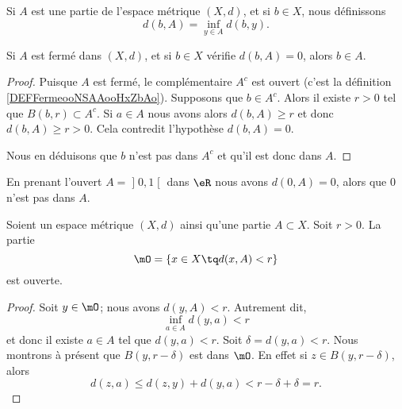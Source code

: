 \begin{definition}      \label{DEFooGNNUooFUZINs}
	Si \( A\) est une partie de l'espace métrique \( (X,d)\), et si \( b\in X\), nous définissons
	\begin{equation}
		d(b,A)=\inf_{y\in A}d(b,y).
	\end{equation}
\end{definition}

\begin{lemma}        \label{LEMooAIARooQADaxM}
	Si \( A\) est fermé dans \( (X,d)\), et si \( b\in X\) vérifie \( d(b,A)=0\), alors \( b\in A\).
\end{lemma}

\begin{proof}
	Puisque \( A\) est fermé, le complémentaire \( A^c\) est ouvert (c'est la définition \ref{DEFFermeooNSAAooHxZbAo}). Supposons que \( b\in A^c\). Alors il existe \( r>0\) tel que \( B(b,r)\subset A^c\). Si \( a\in A\) nous avons alors \( d(b,A)\geq r\) et donc \( d(b,A)\geq r>0\). Cela contredit l'hypothèse \( d(b,A)=0\).

	Nous en déduisons que \( b\) n'est pas dans \( A^c\) et qu'il est donc dans \( A\).
\end{proof}


\begin{example}
	En prenant l'ouvert \( A=\mathopen] 0 , 1 \mathclose[\) dans \( \eR\) nous avons \( d(0,A)=0\), alors que \( 0\) n'est pas dans \( A\).
\end{example}

\begin{lemma}    \label{LEMooJNRTooZyKiFC}
	Soient un espace métrique \( (X,d)\) ainsi qu'une partie \( A\subset X\). Soit \( r>0\). La partie
	\begin{equation}
		\mO=\{ x\in X\tq d(x,A) < r\}
	\end{equation}
	est ouverte.
\end{lemma}

\begin{proof}
	Soit \( y\in \mO\); nous avons \( d(y,A)<r\). Autrement dit,
	\begin{equation}
		\inf_{a\in A}d(y,a)<r
	\end{equation}
	et donc il existe \( a\in A\) tel que \( d(y,a)<r\). Soit \( \delta=d(y,a)<r\). Nous montrons à présent que \( B(y,r-\delta)\) est dans \( \mO\). En effet si \( z\in B(y,r-\delta)\), alors
	\begin{equation}
		d(z,a)\leq d(z,y)+d(y,a)<r-\delta+\delta=r.
	\end{equation}
\end{proof}

